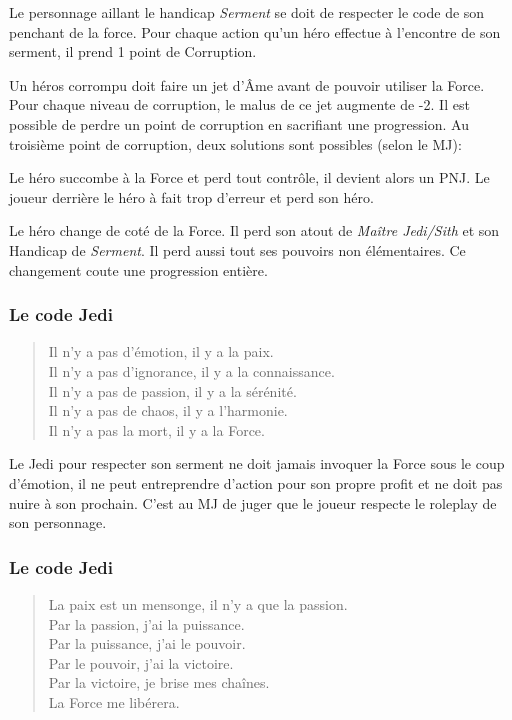 Le personnage aillant le handicap \emph{Serment} se doit de respecter le code de son penchant de la force. Pour chaque action qu'un héro effectue à l'encontre de son serment, il prend 1 point de Corruption. 

Un héros corrompu doit faire un jet d'\^Ame avant de pouvoir utiliser la Force. Pour chaque niveau de corruption, le malus de ce jet augmente de -2. Il est possible de perdre un point de corruption en sacrifiant une progression. Au troisième point de corruption, deux solutions sont possibles (selon le MJ):

\begin{description}[align=left] 
    \item [Perte de contrôle]
        Le héro succombe à la Force et perd tout contrôle, il devient alors un PNJ. Le joueur derrière le héro à fait trop d'erreur et perd son héro.

    \item [Changement de coté]
    	Le héro change de coté de la Force. Il perd son atout de \emph{Maître Jedi/Sith} et son Handicap de \emph{Serment}. Il perd aussi tout ses pouvoirs non élémentaires. Ce changement coute une progression entière.
\end{description}

\subsubsection{Le code Jedi}
\begin{quote}
Il n’y a pas d’émotion, il y a la paix. \\
Il n’y a pas d’ignorance, il y a la connaissance. \\ 
Il n’y a pas de passion, il y a la sérénité. \\ 
Il n’y a pas de chaos, il y a l’harmonie. \\ 
Il n’y a pas la mort, il y a la Force. 
\end{quote}

Le Jedi pour respecter son serment ne doit jamais invoquer la Force sous le coup d'émotion, il ne peut entreprendre d'action pour son propre profit et ne doit pas nuire à son prochain. C'est au MJ de juger que le joueur respecte le roleplay de son personnage.

\subsubsection{Le code Jedi}
\begin{quote}
La paix est un mensonge, il n’y a que la passion. \\
Par la passion, j’ai la puissance. \\
Par la puissance, j’ai le pouvoir. \\
Par le pouvoir, j’ai la victoire. \\
Par la victoire, je brise mes chaînes. \\
La Force me libérera.
\end{quote}

